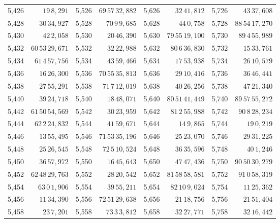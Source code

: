 \begin{tabular}{|r|r||r|r||r|r||r|r|}
5,426 & \(19\,8,\!291\) & 5,526 & \(69\,57\,32,\!882\) & 5,626 & \(32\,41,\!812\) & 5,726 & \(43\,37,\!608\) \\
5,428 & \(30\,34,\!927\) & 5,528 & \(70\,9\,9,\!685\) & 5,628 & \(44\,0,\!758\) & 5,728 & \(88\,54\,17,\!270\) \\
5,430 & \(42\,2,\!058\) & 5,530 & \(20\,46,\!390\) & 5,630 & \(79\,55\,19,\!100\) & 5,730 & \(89\,4\,55,\!989\) \\[1pt]
5,432 & \(60\,53\,29,\!671\) & 5,532 & \(32\,22,\!988\) & 5,632 & \(80\,6\,36,\!830\) & 5,732 & \(15\,33,\!761\) \\
5,434 & \(61\,4\,57,\!756\) & 5,534 & \(43\,59,\!466\) & 5,634 & \(17\,53,\!938\) & 5,734 & \(26\,10,\!579\) \\
5,436 & \(16\,26,\!300\) & 5,536 & \(70\,55\,35,\!813\) & 5,636 & \(29\,10,\!416\) & 5,736 & \(36\,46,\!441\) \\
5,438 & \(27\,55,\!291\) & 5,538 & \(71\,7\,12,\!019\) & 5,638 & \(40\,26,\!256\) & 5,738 & \(47\,21,\!340\) \\
5,440 & \(39\,24,\!718\) & 5,540 & \(18\,48,\!071\) & 5,640 & \(80\,51\,41,\!449\) & 5,740 & \(89\,57\,55,\!272\) \\[1pt]
5,442 & \(61\,50\,54,\!569\) & 5,542 & \(30\,23,\!959\) & 5,642 & \(81\,2\,55,\!988\) & 5,742 & \(90\,8\,28,\!234\) \\
5,444 & \(62\,2\,24,\!832\) & 5,544 & \(41\,59,\!671\) & 5,644 & \(14\,9,\!865\) & 5,744 & \(19\,0,\!219\) \\
5,446 & \(13\,55,\!495\) & 5,546 & \(71\,53\,35,\!196\) & 5,646 & \(25\,23,\!070\) & 5,746 & \(29\,31,\!225\) \\
5,448 & \(25\,26,\!545\) & 5,548 & \(72\,5\,10,\!524\) & 5,648 & \(36\,35,\!596\) & 5,748 & \(40\,1,\!246\) \\
5,450 & \(36\,57,\!972\) & 5,550 & \(16\,45,\!643\) & 5,650 & \(47\,47,\!436\) & 5,750 & \(90\,50\,30,\!279\) \\[1pt]
5,452 & \(62\,48\,29,\!763\) & 5,552 & \(28\,20,\!542\) & 5,652 & \(81\,58\,58,\!581\) & 5,752 & \(91\,0\,58,\!319\) \\
5,454 & \(63\,0\,1,\!906\) & 5,554 & \(39\,55,\!211\) & 5,654 & \(82\,10\,9,\!024\) & 5,754 & \(11\,25,\!362\) \\
5,456 & \(11\,34,\!390\) & 5,556 & \(72\,51\,29,\!638\) & 5,656 & \(21\,18,\!756\) & 5,756 & \(21\,51,\!404\) \\
5,458 & \(23\,7,\!201\) & 5,558 & \(73\,3\,3,\!812\) & 5,658 & \(32\,27,\!771\) & 5,758 & \(32\,16,\!442\) \\

\end{tabular}
